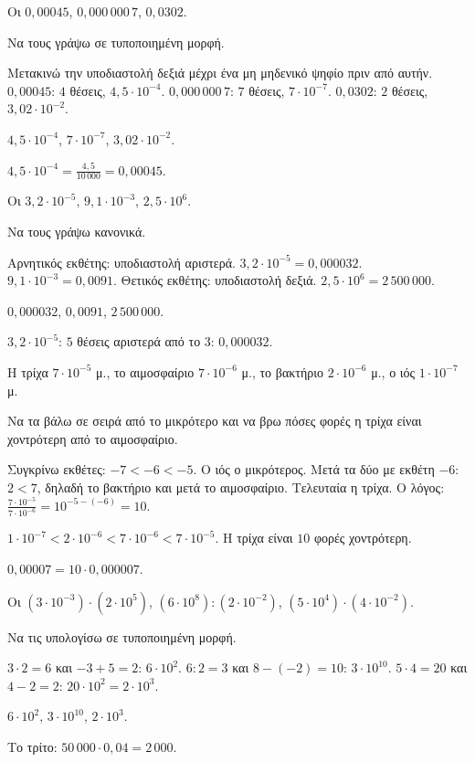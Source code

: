 
\tixero Οι $0{,}00045$, $0{,}000\,000\,7$, $0{,}0302$.\par
\tithelo Να τους γράψω σε τυποποιημένη μορφή.\par
\possindeo Μετακινώ την υποδιαστολή δεξιά μέχρι ένα μη μηδενικό ψηφίο πριν από αυτήν. $0{,}00045$: $4$ θέσεις, $4{,}5\cdot10^{-4}$. $0{,}000\,000\,7$: $7$ θέσεις, $7\cdot10^{-7}$. $0{,}0302$: $2$ θέσεις, $3{,}02\cdot10^{-2}$.\par
\apantisi $4{,}5\cdot10^{-4}$, $7\cdot10^{-7}$, $3{,}02\cdot10^{-2}$.\par
\elegxos $4{,}5\cdot10^{-4}=\frac{4{,}5}{10\,000}=0{,}00045$.

\tixero Οι $3{,}2\cdot10^{-5}$, $9{,}1\cdot10^{-3}$, $2{,}5\cdot10^{6}$.\par
\tithelo Να τους γράψω κανονικά.\par
\possindeo Αρνητικός εκθέτης: υποδιαστολή αριστερά. $3{,}2\cdot10^{-5}=0{,}000032$. $9{,}1\cdot10^{-3}=0{,}0091$. Θετικός εκθέτης: υποδιαστολή δεξιά. $2{,}5\cdot10^6=2\,500\,000$.\par
\apantisi $0{,}000032$, $0{,}0091$, $2\,500\,000$.\par
\elegxos $3{,}2\cdot10^{-5}$: $5$ θέσεις αριστερά από το $3$: $0{,}000032$.

\tixero Η τρίχα $7\cdot10^{-5}$ μ., το αιμοσφαίριο $7\cdot10^{-6}$ μ., το βακτήριο $2\cdot10^{-6}$ μ., ο ιός $1\cdot10^{-7}$ μ.\par
\tithelo Να τα βάλω σε σειρά από το μικρότερο και να βρω πόσες φορές η τρίχα είναι χοντρότερη από το αιμοσφαίριο.\par
\possindeo Συγκρίνω εκθέτες: $-7<-6<-5$. Ο ιός ο μικρότερος. Μετά τα δύο με εκθέτη $-6$: $2<7$, δηλαδή το βακτήριο και μετά το αιμοσφαίριο. Τελευταία η τρίχα. Ο λόγος: $\frac{7\cdot10^{-5}}{7\cdot10^{-6}}=10^{-5-(-6)}=10$.\par
\apantisi $1\cdot10^{-7}<2\cdot10^{-6}<7\cdot10^{-6}<7\cdot10^{-5}$. Η τρίχα είναι $10$ φορές χοντρότερη.\par
\elegxos $0{,}00007=10\cdot0{,}000007$.

\tixero Οι $(3\cdot10^{-3})\cdot(2\cdot10^{5})$, $(6\cdot10^{8}):(2\cdot10^{-2})$, $(5\cdot10^{4})\cdot(4\cdot10^{-2})$.\par
\tithelo Να τις υπολογίσω σε τυποποιημένη μορφή.\par
\possindeo $3\cdot2=6$ και $-3+5=2$: $6\cdot10^2$. $6:2=3$ και $8-(-2)=10$: $3\cdot10^{10}$. $5\cdot4=20$ και $4-2=2$: $20\cdot10^2=2\cdot10^3$.\par
\apantisi $6\cdot10^{2}$, $3\cdot10^{10}$, $2\cdot10^{3}$.\par
\elegxos Το τρίτο: $50\,000\cdot0{,}04=2\,000$.

